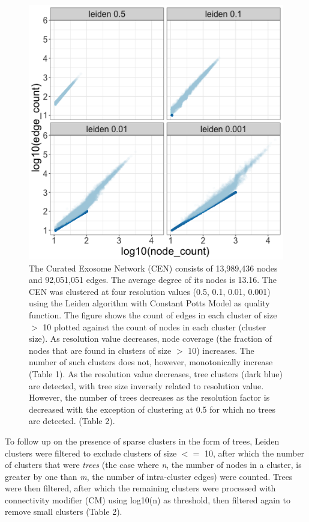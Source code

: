 \documentclass[a4paper]{article}   	%
\begin{document}
\begin{figure}[H]
\centering
\includegraphics[width=0.7\linewidth]{figs/cen_quad_fig1.png}
\caption{The Curated Exosome Network (CEN) consists of 13,989,436 nodes and 92,051,051 edges. The average degree of its nodes is 13.16. The CEN was clustered at four resolution values (0.5, 0.1, 0.01, 0.001) using the Leiden algorithm with Constant Potts Model as quality function. The figure shows the count of edges in each cluster of size $>$  10 plotted against the count of nodes in each cluster (cluster size). As resolution value decreases, node coverage (the fraction of nodes that are found in clusters of size $>$  10) increases. The number of such clusters does not, however, monotonically increase (Table 1). As the resolution value decreases, tree clusters (dark blue) are detected, with tree size inversely related to resolution value. However, the number of trees decreases as the resolution factor is decreased with the exception of clustering at 0.5 for which no trees are detected. (Table 2).}
\end{figure}

To follow up on the presence of sparse clusters in the form of trees, Leiden clusters were filtered to exclude clusters of size $<=$ 10, after which the number of clusters that were \emph{trees} (the case where \emph{n}, the number of nodes in a cluster, is greater by one than \emph{m}, the number of intra-cluster edges) were counted. Trees were then filtered, after which the remaining clusters were processed with connectivity modifier (CM) using log10(n) as threshold, then filtered again to remove small clusters (Table 2).

\end{document}
